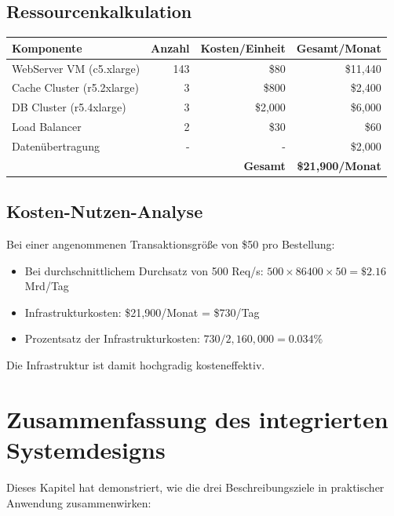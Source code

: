 \documentclass[a4paper,11pt]{article}
\theoremstyle{definition}
\begin{document}
\subsection{Ressourcenkalkulation}

\begin{table}[H]
    \centering
    \begin{tabular}{|l|r|r|r|}
        \hline
        \textbf{Komponente} & \textbf{Anzahl} & \textbf{Kosten/Einheit} & \textbf{Gesamt/Monat} \\
        \hline
        WebServer VM (c5.xlarge) & 143 & \$80 & \$11,440 \\
        Cache Cluster (r5.2xlarge) & 3 & \$800 & \$2,400 \\
        DB Cluster (r5.4xlarge) & 3 & \$2,000 & \$6,000 \\
        Load Balancer & 2 & \$30 & \$60 \\
        Datenübertragung & - & - & \$2,000 \\
        \hline
        & & \textbf{Gesamt} & \textbf{\$21,900/Monat} \\
        \hline
    \end{tabular}
\end{table}

\subsection{Kosten-Nutzen-Analyse}

Bei einer angenommenen Transaktionsgröße von \$50 pro Bestellung:

\begin{itemize}
    \item Bei durchschnittlichem Durchsatz von 500 Req/s: $500 \times 86400 \times 50 = \$2.16$ Mrd/Tag
    \item Infrastrukturkosten: \$21,900/Monat = \$730/Tag
    \item Prozentsatz der Infrastrukturkosten: $730 / 2,160,000 = 0.034\%$
\end{itemize}

Die Infrastruktur ist damit hochgradig kosteneffektiv.

\section{Zusammenfassung des integrierten Systemdesigns}

Dieses Kapitel hat demonstriert, wie die drei Beschreibungsziele in praktischer Anwendung zusammenwirken:
\end{document}
